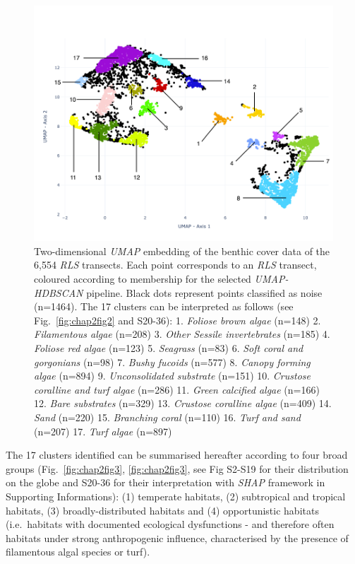 \begin{refsection}
\begin{figure}
\hypertarget{fig:chap2fig1}{%
\centering
\includegraphics{03-Chapitre2/figures/fig1.png}
\caption[Two-dimensional \emph{UMAP} embedding of the benthic cover data
of the 6,554 \emph{RLS} transects.]{Two-dimensional \emph{UMAP} embedding of the benthic cover data
of the 6,554 \emph{RLS} transects. Each point corresponds to an \emph{RLS}
transect, coloured according to membership for the selected
\emph{UMAP-HDBSCAN} pipeline. Black dots represent points classified as
noise (n=1464). The 17 clusters can be interpreted as follows (see
Fig.~\ref{fig:chap2fig2} and S20-36): 1. \emph{Foliose brown algae}
(n=148) 2. \emph{Filamentous algae} (n=208) 3. \emph{Other Sessile
invertebrates} (n=185) 4. \emph{Foliose red algae} (n=123) 5.
\emph{Seagrass} (n=83) 6. \emph{Soft coral and gorgonians} (n=98) 7.
\emph{Bushy fucoids} (n=577) 8. \emph{Canopy forming algae} (n=894) 9.
\emph{Unconsolidated substrate} (n=151) 10. \emph{Crustose coralline and
turf algae} (n=286) 11. \emph{Green calcified algae} (n=166) 12.
\emph{Bare substrates} (n=329) 13. \emph{Crustose coralline algae}
(n=409) 14. \emph{Sand} (n=220) 15. \emph{Branching coral} (n=110) 16.
\emph{Turf and sand} (n=207) 17. \emph{Turf algae}
(n=897)}\label{fig:chap2fig1}
}
\end{figure}

The 17 clusters identified can be summarised hereafter according to four
broad groups (Fig.~\ref{fig:chap2fig3}, \ref{fig:chap2fig3}, see Fig S2-S19 for their
distribution on the globe and S20-36 for their interpretation with
\emph{SHAP} framework in Supporting Informations): (1) temperate
habitats, (2) subtropical and tropical habitats, (3) broadly-distributed
habitats and (4) opportunistic habitats (i.e.~habitats with documented
ecological dysfunctions - and therefore often habitats under strong
anthropogenic influence, characterised by the presence of filamentous
algal species or turf).


\end{refsection}
